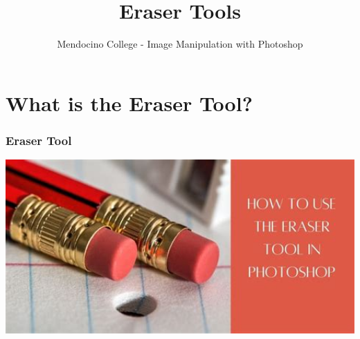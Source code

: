 \documentclass{beamer}
\title{Eraser Tools}
\author{Mendocino College - Image Manipulation with Photoshop}
\date{\vspace{-5em}}
\begin{document}
	{
		\begin{frame}
			\vspace{-35pt}
			\maketitle
		\end{frame}
	}

\section{What is the Eraser Tool?}	

\begin{frame}
	\frametitle{Eraser Tool}
	\begin{center}
		\includegraphics[width = 1.0\textwidth]{images/th (2).jpg}
	\end{center}
\end{frame}
\end{document}
